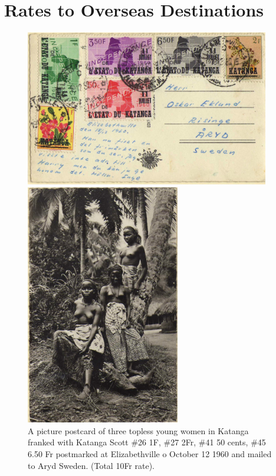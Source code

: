 \chapter{Rates to Overseas Destinations}
 \captionlorem
\begin{figure}[htp]

\includegraphics[width=0.95\textwidth]{../katanga/postcard-back.jpg}


\captionlorem


\includegraphics[width=0.60\textwidth]{../katanga/postcard-front.jpg}


\caption{
A picture postcard of three topless young women in Katanga franked
with Katanga Scott \#26 1F, \#27 2Fr, \#41 50 cents, \#45 6.50 Fr postmarked
at Elizabethville o October 12 1960 and mailed to Aryd Sweden.
(Total 10Fr rate).
}
\end{figure}                


                          